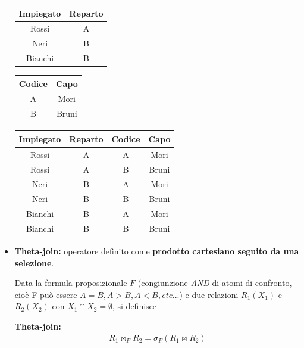 \documentclass{article}
\begin{document}
\begin{itemize}
\noindent \begin{minipage}{.25\textwidth}
  \centering
    \begin{tabular}{|c|c|}
        \hline
        \textbf{Impiegato} & \textbf{Reparto} \\
        \hline
        Rossi & A \\
        \hline
        Neri &  B \\
        \hline
        Bianchi & B \\
         \hline
        \end{tabular}
\end{minipage}%
\hspace{0.1em}
\begin{minipage}{.25\textwidth}
  \centering
       \begin{tabular}{|c|c|}
        \hline
        \textbf{Codice} & \textbf{Capo} \\
        \hline
        A & Mori\\
        \hline
        B & Bruni\\
         \hline
        \end{tabular}
\end{minipage}
\hspace{0.1em}
\begin{minipage}{.5\textwidth}
  \centering
    \begin{tabular}{|c|c|c|c|}
        \hline
        \textbf{Impiegato} & \textbf{Reparto} & \textbf{Codice} & \textbf{Capo} \\
        \hline
        Rossi & A & A & Mori \\
        \hline
        Rossi & A & B & Bruni \\
        \hline
        Neri & B & A & Mori \\
        \hline
        Neri & B & B & Bruni \\
        \hline
        Bianchi & B & A & Mori \\
        \hline
        Bianchi & B & B & Bruni \\
        \hline
    \end{tabular}
\end{minipage}




\item \textbf{Theta-join:} operatore definito come\textbf{ prodotto cartesiano seguito da una selezione}. 

Data la formula proposizionale $F$ (congiunzione \emph{AND} di atomi di confronto, cioè F può essere $A=B, A > B, A < B, etc...$) e due relazioni $R_1(X_1)$ e $R_2(X_2)$ con $X_1 \cap X_2 = \emptyset$, si definisce 

\textbf{Theta-join:} \begin{align*}
    R_1 \bowtie_F R_2 = \sigma_F(R_1\bowtie R_2)
\end{align*}

\end{itemize}
\end{document}
